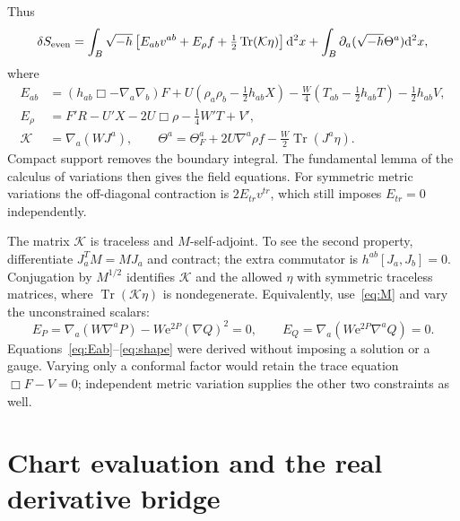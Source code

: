 \documentclass[11pt]{article}
\newcommand{\Tr}{\operatorname{Tr}}
\newcommand{\dd}{\mathrm d}
\newcommand{\vol}{\sqrt{-h}}
\newcommand{\e}{\mathrm e}
\begin{document}
Thus
\begin{equation}\label{eq:firstvar}
 \delta S_{\rm even}=\int_B\vol\left[E_{ab}v^{ab}+E_\rho f+\tfrac12\Tr(\mathcal K\eta)\right]\dd^2x
 +\int_B\partial_a(\vol\Theta^a)\dd^2x,
\end{equation}
where
\begin{align}
 E_{ab}&=(h_{ab}\Box-\nabla_a\nabla_b)F
 +U(\rho_a\rho_b-\tfrac12h_{ab}X)
 -\frac W4(T_{ab}-\tfrac12h_{ab}T)-\tfrac12h_{ab}V,\label{eq:Eab}\\
 E_\rho&=F'R-U'X-2U\Box\rho-\tfrac14W'T+V',\label{eq:Erho}\\
 \mathcal K&=\nabla_a(WJ^a),\qquad
 \Theta^a=\Theta_F^a+2U\nabla^a\rho f-\tfrac W2\Tr(J^a\eta).
\end{align}
Compact support removes the boundary integral. The fundamental lemma of the calculus of variations then gives the field equations. For symmetric metric variations the off-diagonal contraction is $2E_{tr}v^{tr}$, which still imposes $E_{tr}=0$ independently.

The matrix $\mathcal K$ is traceless and $M$-self-adjoint. To see the second property, differentiate $J_a^TM=MJ_a$ and contract; the extra commutator is $h^{ab}[J_a,J_b]=0$. Conjugation by $M^{1/2}$ identifies $\mathcal K$ and the allowed $\eta$ with symmetric traceless matrices, where $\Tr(\mathcal K\eta)$ is nondegenerate. Equivalently, use~\eqref{eq:M} and vary the unconstrained scalars:
\begin{equation}\label{eq:shape}
 E_P=\nabla_a(W\nabla^aP)-W\e^{2P}(\nabla Q)^2=0,
 \qquad E_Q=\nabla_a(W\e^{2P}\nabla^aQ)=0.
\end{equation}
Equations~\eqref{eq:Eab}--\eqref{eq:shape} were derived without imposing a solution or a gauge. Varying only a conformal factor would retain the trace equation $\Box F-V=0$; independent metric variation supplies the other two constraints as well.

\section{Chart evaluation and the real derivative bridge}\label{sec:selection}
\end{document}
